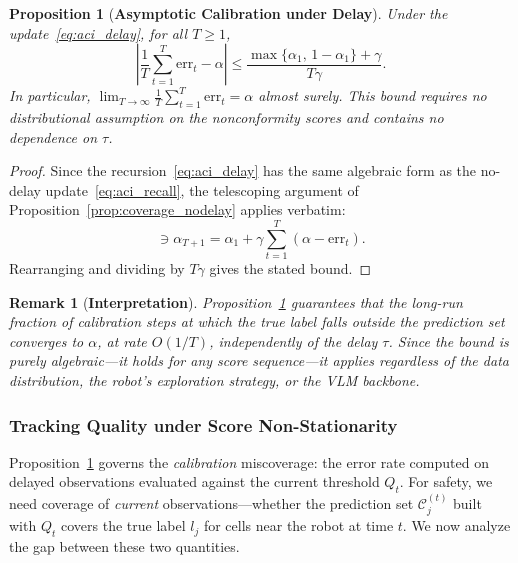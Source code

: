 \documentclass[letterpaper, 10 pt, conference]{ieeeconf}  %
\newtheorem{myprop}{\bf Proposition}
\newtheorem{remark}{Remark}
\begin{document}
\begin{myprop}[\textbf{Asymptotic Calibration under Delay}]
\label{prop:coverage_delay}
Under the update~\eqref{eq:aci_delay}, for all $T \ge 1$,
\begin{equation}
    \left| \frac{1}{T} \sum_{t=1}^T \text{err}_t - \alpha \right| \le \frac{\max\{\alpha_1,\, 1-\alpha_1\} + \gamma}{T\gamma}.
    \label{eq:coverage_delay}
\end{equation}
In particular, $\lim_{T \to \infty} \frac{1}{T}\sum_{t=1}^T \text{err}_t = \alpha$ almost surely. This bound requires \emph{no distributional assumption} on the nonconformity scores and contains \emph{no dependence on $\tau$}.
\end{myprop}

\begin{proof}
Since the recursion~\eqref{eq:aci_delay} has the same algebraic form as the no-delay update~\eqref{eq:aci_recall}, the telescoping argument of Proposition~\ref{prop:coverage_nodelay} applies verbatim:
\begin{equation}
    [-\gamma, 1+\gamma] \ni \alpha_{T+1} = \alpha_1 + \gamma\!\sum_{t=1}^T (\alpha - \text{err}_t).
\end{equation}
Rearranging and dividing by $T\gamma$ gives the stated bound.
\end{proof}

\begin{remark}[\textbf{Interpretation}]
\label{rem:calib_interp}
Proposition~\ref{prop:coverage_delay} guarantees that the long-run fraction of calibration steps at which the true label falls outside the prediction set converges to $\alpha$, at rate $O(1/T)$, independently of the delay $\tau$. Since the bound is purely algebraic---it holds for \emph{any} score sequence---it applies regardless of the data distribution, the robot's exploration strategy, or the VLM backbone.
\end{remark}

\subsubsection{Tracking Quality under Score Non-Stationarity}

Proposition~\ref{prop:coverage_delay} governs the \emph{calibration} miscoverage: the error rate computed on delayed observations evaluated against the current threshold $Q_t$. For safety, we need coverage of \emph{current} observations---whether the prediction set $\mathcal{C}_j^{(t)}$ built with $Q_t$ covers the true label $l_j$ for cells near the robot at time $t$. We now analyze the gap between these two quantities.
\end{document}
